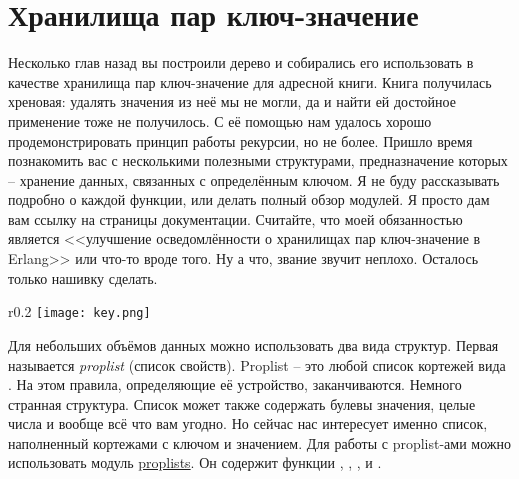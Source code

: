 \section{Хранилища пар ключ\--значение}
\label{key-value-stores}
Несколько глав назад вы построили дерево и собирались его использовать в качестве хранилища пар ключ\--значение для адресной книги.
Книга получилась хреновая: удалять значения из неё мы не могли, да и найти ей достойное применение тоже не получилось.
С её помощью нам удалось хорошо продемонстрировать принцип работы рекурсии, но не более.
Пришло время познакомить вас с несколькими полезными структурами, предназначение которых \--- хранение данных, связанных с определённым ключом.
Я не буду рассказывать подробно о каждой функции, или делать полный обзор модулей.
Я просто дам вам ссылку на страницы документации.
Считайте, что моей обязанностью является <<улучшение осведомлённости о хранилищах пар ключ\--значение в Erlang>> или что\--то вроде того.
Ну а что, звание звучит неплохо.
Осталось только нашивку сделать.
\begin{wrapfigure}{r}{0.2\linewidth}
    \texttt{[image: key.png]}
\end{wrapfigure}

Для небольших объёмов данных можно использовать два вида структур.
Первая называется \emph{proplist} (список свойств).
Proplist \--- это любой список кортежей вида .
На этом правила, определяющие её устройство, заканчиваются.
Немного странная структура.
Список может также содержать булевы значения, целые числа и вообще всё что вам угодно.
Но сейчас нас интересует именно список, наполненный кортежами с ключом и значением.
Для работы с proplist\--ами можно использовать модуль \href{http://erldocs.com/R15B/stdlib/proplists.html}{proplists}.
Он содержит функции , , ,  и .

